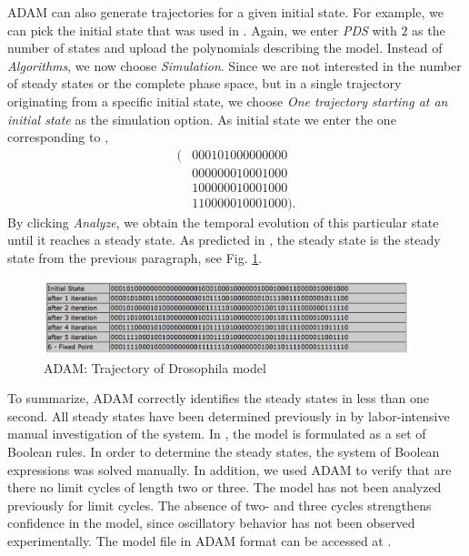 \documentclass[11pt]{amsart}
\begin{document}
ADAM can also generate trajectories for a given initial state. For example, we
can pick the initial state that was used in \cite[Figure 4(a)]{AO}. Again, we
enter {\it PDS} with $2$ as the number of states and upload the polynomials
describing the model. Instead of {\it Algorithms}, we now choose {\it
Simulation}. Since we are not interested in the number of steady states or the
complete phase space, but in a single trajectory originating from a specific
initial state,  we choose {\it One trajectory starting at an initial state} as the simulation option. As
initial state we enter the one corresponding to \cite[Figure 4(a)]{AO},
\begin{align*}
(&0 0 0 1 0 1 0 0 0 0 0 0 0 0 0\\
&0 0 0 0 0 0 0 1 0 0 0 1 0 0 0\\
&1 0 0 0 0 0 0 1 0 0 0 1 0 0 0\\
&1 1 0 0 0 0 0 1 0 0 0 1 0 0 0).
\end{align*}
By clicking {\it Analyze}, we obtain the temporal evolution of this particular
state until it reaches a steady state. As predicted in \cite{AO}, the
steady state is the steady state from the previous paragraph, see Fig.
\ref{fig:traj}.
\begin{figure}[htb]
\centering
\includegraphics[width=0.95\textwidth]{DroTraj.jpg}
\caption{ADAM: Trajectory of Drosophila model}
\label{fig:traj}
\end{figure}
To summarize, ADAM correctly identifies the steady states
in less than one second. All steady states have been determined previously in \cite{AO} by labor-intensive manual investigation of the system. In \cite{AO}, the model is formulated as a set of Boolean rules. In order to determine the steady states, the system of Boolean expressions was solved manually.
In addition, we used ADAM to verify that are there no limit
cycles of length two or three. The model has not been analyzed previously for
limit cycles. The absence of two- and three cycles strengthens confidence in
the model, since oscillatory behavior has not been observed experimentally.
The model file in ADAM format can be accessed at \cite{DrosophilaModel}.
\end{document}
